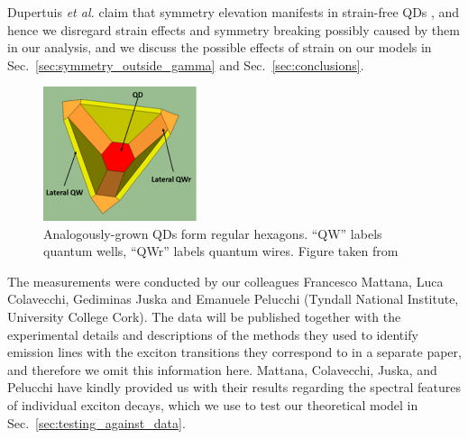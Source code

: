 \documentclass[12pt]{article}
\numberwithin{equation}{section}
\begin{document}
Dupertuis \textit{et al.} claim that symmetry elevation manifests in strain-free QDs \cite[p.~4]{dupertuis}, and hence we disregard strain effects and symmetry breaking possibly caused by them in our analysis, and we discuss the possible effects of strain on our models in Sec.~\ref{sec:symmetry_outside_gamma} and Sec.~\ref{sec:conclusions}.

\begin{figure}
\begin{center}
    \includegraphics[width=0.4\textwidth]{figures/hexagonal_qds}
 \caption{Analogously-grown QDs form regular hexagons. ``QW'' labels quantum wells, ``QWr'' labels quantum wires. Figure taken from \cite[Fig.~1]{hexagon}\label{fig:hexagonal_qds}}
\end{center}
\end{figure}

The measurements were conducted by our colleagues Francesco Mattana, Luca Colavecchi, Gediminas Juska and Emanuele Pelucchi (Tyndall National Institute, University College Cork). The data will be published together with the experimental details and descriptions of the methods they used to identify emission lines with the exciton transitions they correspond to in a separate paper, and therefore we omit this information here. Mattana, Colavecchi, Juska, and Pelucchi have kindly provided us with their results regarding the spectral features of individual exciton decays, which we use to test our theoretical model in Sec.~\ref{sec:testing_against_data}. 

\pagebreak








\end{document}
